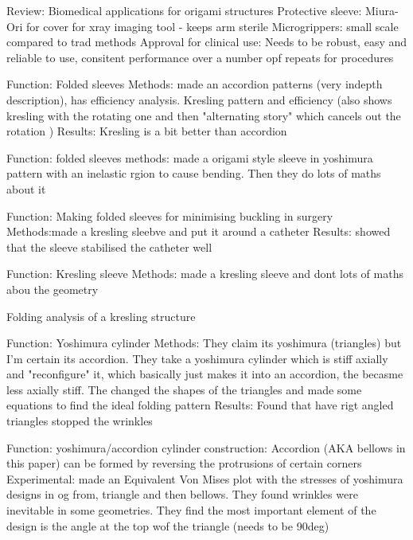 \cite{johnson2017fabricating}
Review: Biomedical applications for origami structures
Protective sleeve: Miura-Ori for cover for xray imaging tool - keeps arm sterile
Microgrippers: small scale compared to trad methods
Approval for clinical use: Needs to be robust, easy and reliable to use, consitent performance over a number opf repeats for procedures

\cite{bruton2016packing}
Function: Folded sleeves
Methods: made an accordion patterns (very indepth description), has efficiency analysis. Kresling pattern and efficiency (also shows kresling with the rotating one and then "alternating story" which cancels out the rotation )
Results: Kresling is a bit better than accordion


\cite{qiao2017structure}
Function: folded sleeves
methods: made a origami style sleeve in yoshimura pattern with an inelastic rgion to cause bending. Then they do lots of maths about it

\cite{sargent2018using}
Function: Making folded sleeves for minimising buckling in surgery
Methods:made a kresling sleebve and put it around a catheter
Results: showed that the sleeve stabilised the catheter well


\cite{jianguo2015bistable}
Function: Kresling sleeve
Methods: made a kresling sleeve and dont lots of maths abou the geometry

\cite{jianguo2016folding}
Folding analysis of a kresling structure

\cite{suh2020new}
Function: Yoshimura cylinder
Methods: They claim its yoshimura (triangles) but I'm certain its accordion. They take a yoshimura cylinder which is stiff axially and "reconfigure" it, which basically just makes it into an accordion, the becasme less axially stiff. The changed the shapes of the triangles and made some equations to find the ideal folding pattern
Results: Found that have rigt angled triangles stopped the wrinkles

\cite{suh2021new}
Function: yoshimura/accordion cylinder
construction: Accordion (AKA bellows in this paper) can be formed by reversing the protrusions of certain corners
Experimental: made an Equivalent Von Mises plot with the stresses of yoshimura designs in og from, triangle and then bellows. They found wrinkles were inevitable in some geometries. They find the most important element of the design is the angle at the top wof the triangle (needs to be 90deg) %

